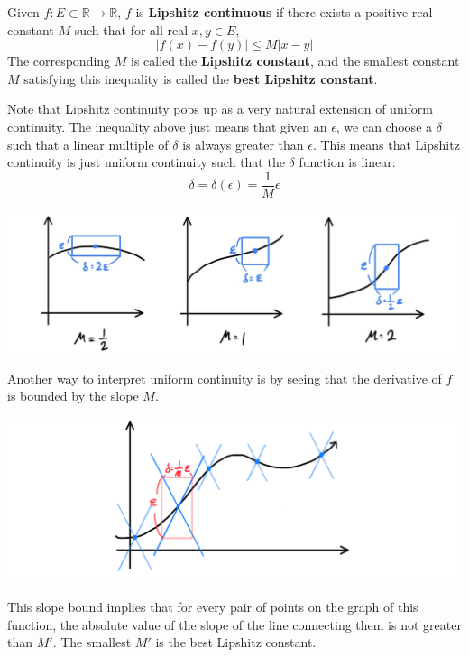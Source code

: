 \documentclass{article}
\begin{document}
    \begin{definition}
      Given $f: E \subset \mathbb{R} \longrightarrow \mathbb{R}$, $f$ is \textbf{Lipshitz continuous} if there exists a positive real constant $M$ such that for all real $x, y \in E$, 
      \[\big| f(x) - f(y) \big| \leq M \big| x - y \big|\]
      The corresponding $M$ is called the \textbf{Lipshitz constant}, and the smallest constant $M$ satisfying this inequality is called the \textbf{best Lipshitz constant}. 

      Note that Lipshitz continuity pops up as a very natural extension of uniform continuity. The inequality above just means that given an $\epsilon$, we can choose a $\delta$ such that a linear multiple of $\delta$ is always greater than $\epsilon$. This means that Lipshitz continuity is just uniform continuity such that the $\delta$ function is linear:  
      \[\delta = \delta(\epsilon) = \frac{1}{M} \epsilon\]
      \begin{center}
          \includegraphics[scale=0.25]{img/Lipshitz_Continuity.jpg}
      \end{center}
    \end{definition}

    Another way to interpret uniform continuity is by seeing that the derivative of $f$ is bounded by the slope $M$. 
    \begin{center}
        \includegraphics[scale=0.3]{img/Lipshitz_Continuity_Slope_Bound.PNG}
    \end{center}
    This slope bound implies that for every pair of points on the graph of this function, the absolute value of the slope of the line connecting them is not greater than $M'$. The smallest $M'$ is the best Lipshitz constant. 
\end{document}
